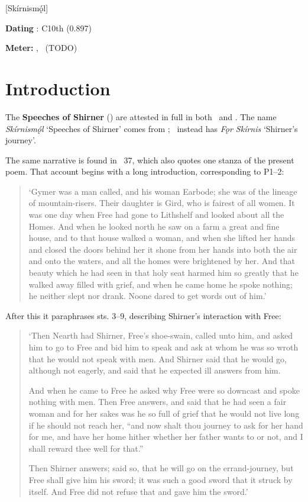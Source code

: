 [Skírnismǫ́l]

\begin{flushright}%
\textbf{Dating} \parencite{Sapp2022}: C10th (0.897)

\textbf{Meter:} \Ljodahattr, \Galdralag\ (TODO)%
\end{flushright}

\section{Introduction}

The \textbf{Speeches of Shirner} (\Skirnismal) are attested in full in both \Regius\ and \AM.  The name \emph{Skírnismǫ́l} ‘Speeches of Shirner’ comes from \AM; \Regius\ instead has \emph{Fǫr Skírnis} ‘Shirner’s journey’.

The same narrative is found in \Gylfaginning\ 37, which also quotes one stanza of the present poem.  That account begins with a long introduction, corresponding to P1–2:

\begin{quote}‘Gymer was a man called, and his woman Earbode; she was of the lineage of mountain-risers. Their daughter is Gird, who is fairest of all women.  It was one day when Free had gone to Lithshelf and looked about all the Homes.  And when he looked north he saw on a farm a great and fine house, and to that house walked a woman, and when she lifted her hands and closed the doors behind her it shone from her hands into both the air and onto the waters, and all the homes were brightened by her.  And that beauty which he had seen in that holy seat harmed him so greatly that he walked away filled with grief, and when he came home he spoke nothing; he neither slept nor drank.  Noone dared to get words out of him.’\end{quote}

After this it paraphrases sts. 3–9, describing Shirner’s interaction with Free:

\begin{quote}‘Then Nearth had Shirner, Free’s shoe-swain, called unto him, and asked him to go to Free and bid him to speak and ask at whom he was so wroth that he would not speak with men.  And Shirner said that he would go, although not eagerly, and said that he expected ill answers from him.

And when he came to Free he asked why Free were so downcast and spoke nothing with men.  Then Free answers, and said that he had seen a fair woman and for her sakes was he so full of grief that he would not live long if he should not reach her, “and now shalt thou journey to ask for her hand for me, and have her home hither whether her father wants to or not, and I shall reward thee well for that.”

Then Shirner answers; said so, that he will go on the errand-journey, but Free shall give him his sword; it was such a good sword that it struck by itself.  And Free did not refuse that and gave him the sword.’\end{quote}

